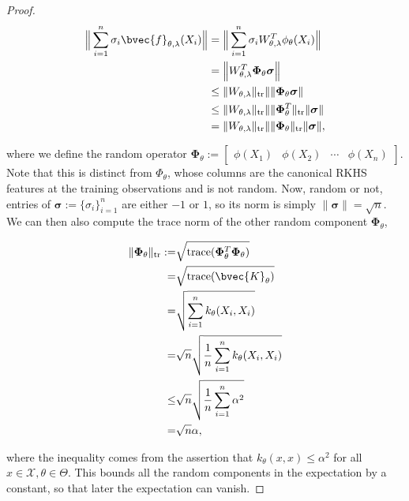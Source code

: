 \documentclass{llncs}
\numberwithin{equation}{section}
\numberwithin{table}{section}
\numberwithin{algorithm}{section}
\begin{document}
\begin{theorem}
\begin{proof}
			\begin{equation}
			\begin{aligned}
			\Big\| \sum_{i = 1}^{n} \sigma_{i}\bvec{f}_{\theta, \lambda}(X_{i}) \Big\| &= \Big\| \sum_{i = 1}^{n} \sigma_{i} W_{\theta, \lambda}^{T} \phi_{\theta}(X_{i}) \Big\| \\
			&= \Big\| W_{\theta, \lambda}^{T} \bm{\Phi}_{\theta} \bm{\sigma} \Big\| \\
			&\leq \| W_{\theta, \lambda} \|_{\mathrm{tr}} \| \| \bm{\Phi}_{\theta} \bm{\sigma} \| \\
			&\leq \| W_{\theta, \lambda} \|_{\mathrm{tr}} \| \| \bm{\Phi}_{\theta}^{T} \|_{\mathrm{tr}} \| \bm{\sigma} \| \\
			&= \| W_{\theta, \lambda} \|_{\mathrm{tr}} \| \| \bm{\Phi}_{\theta} \|_{\mathrm{tr}} \| \bm{\sigma} \|,
			\end{aligned}
			\end{equation}
			
			where we define the random operator $\bm{\Phi}_{\theta} := \begin{bmatrix} \phi(X_{1}) & \phi(X_{2}) & \cdots & \phi(X_{n}) \end{bmatrix}$. Note that this is distinct from $\Phi_{\theta}$, whose columns are the canonical \gls{RKHS} features at the training observations and is not random. Now, random or not, entries of $\bm{\sigma} := \{\sigma_{i}\}_{i = 1}^{n}$ are either $-1$ or $1$, so its norm is simply $\| \bm{\sigma} \| = \sqrt{n}$. We can then also compute the trace norm of the other random component $\bm{\Phi}_{\theta}$,
			
			\begin{equation}
			\begin{aligned}
			\| \bm{\Phi}_{\theta} \|_{\mathrm{tr}} :=& \sqrt{\mathrm{trace}(\bm{\Phi}_{\theta}^{T} \bm{\Phi}_{\theta})} \\
			=& \sqrt{\mathrm{trace}(\bvec{K}_{\theta})} \\
			=& \sqrt{\sum_{i = 1}^{n} k_{\theta}(X_{i}, X_{i})} \\
			=& \sqrt{n} \sqrt{ \frac{1}{n} \sum_{i = 1}^{n} k_{\theta}(X_{i}, X_{i})} \\
			\leq& \sqrt{n} \sqrt{ \frac{1}{n} \sum_{i = 1}^{n} \alpha^{2}} \\
			=& \sqrt{n} \alpha,
			\end{aligned}
			\end{equation}
			
			where the inequality comes from the assertion that $k_{\theta}(x, x) \leq \alpha^{2}$ for all $x \in \mathcal{X}, \theta \in \Theta$. This bounds all the random components in the expectation by a constant, so that later the expectation can vanish. 
			

\end{proof}
\end{theorem}
\end{document}
